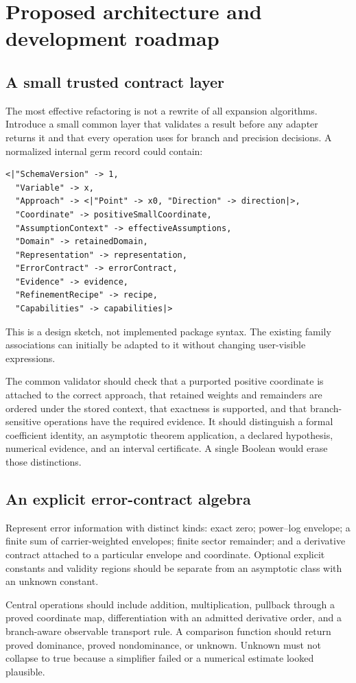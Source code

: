 \section{Proposed architecture and development roadmap}
\subsection{A small trusted contract layer}
The most effective refactoring is not a rewrite of all expansion algorithms. Introduce a small common layer that validates a result before any adapter returns it and that every operation uses for branch and precision decisions. A normalized internal germ record could contain:
\begin{lstlisting}
<|"SchemaVersion" -> 1,
  "Variable" -> x,
  "Approach" -> <|"Point" -> x0, "Direction" -> direction|>,
  "Coordinate" -> positiveSmallCoordinate,
  "AssumptionContext" -> effectiveAssumptions,
  "Domain" -> retainedDomain,
  "Representation" -> representation,
  "ErrorContract" -> errorContract,
  "Evidence" -> evidence,
  "RefinementRecipe" -> recipe,
  "Capabilities" -> capabilities|>
\end{lstlisting}
This is a design sketch, not implemented package syntax. The existing family associations can initially be adapted to it without changing user-visible expressions.

The common validator should check that a purported positive coordinate is attached to the correct approach, that retained weights and remainders are ordered under the stored context, that exactness is supported, and that branch-sensitive operations have the required evidence. It should distinguish a formal coefficient identity, an asymptotic theorem application, a declared hypothesis, numerical evidence, and an interval certificate. A single Boolean  would erase those distinctions.

\subsection{An explicit error-contract algebra}
Represent error information with distinct kinds: exact zero; power--log envelope; a finite sum of carrier-weighted envelopes; finite sector remainder; and a derivative contract attached to a particular envelope and coordinate. Optional explicit constants and validity regions should be separate from an asymptotic class with an unknown constant.

Central operations should include addition, multiplication, pullback through a proved coordinate map, differentiation with an admitted derivative order, and a branch-aware observable transport rule. A comparison function should return proved dominance, proved nondominance, or unknown. Unknown must not collapse to true because a simplifier failed or a numerical estimate looked plausible.

